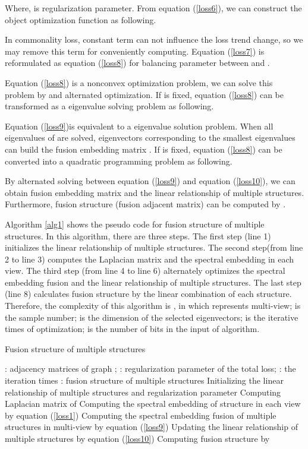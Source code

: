 \documentclass[review]{elsarticle}
\begin{document}
Where,  is regularization parameter.  From equation (\ref{loss6}), we can construct the object optimization function as following.

In commonality loss, constant term  can not influence the loss trend change, so we may remove this term for conveniently computing. Equation (\ref{loss7}) is reformulated as equation (\ref{loss8}) for balancing parameter  between  and .

Equation (\ref{loss8}) is a nonconvex optimization problem, we can solve this problem by  and  alternated optimization. If  is fixed, equation (\ref{loss8}) can be transformed as a eigenvalue solving problem as following.

Equation (\ref{loss9})is equivalent to a eigenvalue solution problem. When all eigenvalues of  are solved, eigenvectors corresponding to the smallest eigenvalues can build the fusion embedding matrix . If  is fixed, equation (\ref{loss8}) can be converted into a quadratic programming problem as following.

By alternated solving between equation (\ref{loss9}) and equation (\ref{loss10}), we can obtain fusion embedding matrix  and the linear relationship  of multiple structures. Furthermore, fusion structure (fusion adjacent matrix) can be computed by .

Algorithm \ref{alg1} shows the pseudo code for fusion structure of multiple structures. In this algorithm, there are three steps. The first step (line 1) initializes the linear relationship of multiple structures. The second step(from line 2 to line 3) computes the Laplacian matrix and the spectral embedding in each view. The third step (from line 4 to line 6) alternately optimizes the spectral embedding fusion and the linear relationship of multiple structures. The last step (line 8) calculates fusion structure by the linear combination of each structure. Therefore, the complexity of this algorithm is , in which  represents multi-view;  is the sample number;  is the dimension of the selected eigenvectors;  is the iterative times of optimization;  is the number of bits in the input of algorithm.

\begin{algorithm}[ht]
  \caption{Fusion structure of multiple structures}
 \begin{algorithmic}[1]
 \label{alg1}
\renewcommand{\algorithmicrequire}{\textbf{Input:}}
\renewcommand{\algorithmicensure}{\textbf{Output:}}
\renewcommand{\algorithmicreturn}{\textbf{Iteration:}}
   \REQUIRE  :  adjacency matrices of graph ; : regularization parameter of the total loss; : the iteration times
   \ENSURE : fusion structure of multiple structures
   \STATE Initializing the linear relationship  of multiple structures and regularization parameter 
   \STATE Computing Laplacian matrix  of 
   \STATE Computing the spectral embedding  of structure in each view by equation (\ref{loss1})
   \FOR {}
   \STATE Computing the spectral embedding fusion  of multiple structures  in multi-view by equation (\ref{loss9})
   \STATE Updating the linear relationship  of multiple structures by equation (\ref{loss10})
   \ENDFOR
   \STATE Computing fusion structure by 
  \end{algorithmic}
\end{algorithm}
\end{document}
